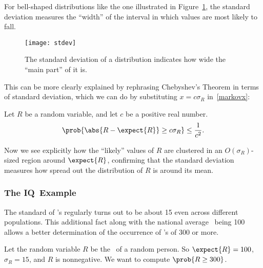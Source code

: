 For bell-shaped distributions like the one illustrated in
Figure~\ref{fig:stdev}, the standard deviation measures the ``width''
of the interval in which values are most likely to fall.
\begin{figure}
  \centerline{\texttt{[image: stdev]}}
  \caption{The standard deviation of a distribution indicates how wide the
    ``main part'' of it is.}
  \label{fig:stdev}
\end{figure}
This can be more clearly explained by rephrasing Chebyshev's Theorem
in terms of standard deviation, which we can do by substituting $x = c
\sigma_R$ in~\eqref{markovx}:
\begin{corollary}\label{cor:cheby}
Let $R$ be a random variable, and let $c$ be a positive real number.
\begin{equation}\label{markovcexp}
\prob{\abs{R - \expect{R}} \geq c \sigma_R} \leq \frac{1}{c^2}.
\end{equation}
\end{corollary}
Now we see explicitly how the ``likely'' values of $R$ are clustered
in an $O(\sigma_R)$-sized region around $\expect{R}$, confirming that
the standard deviation measures how spread out the distribution of $R$
is around its mean.

\iffalse
\begin{proof}
  Substituting $x = c \sigma_R$ in~\eqref{markovx} gives:
  \begin{displaymath}
    \prob{\card{R - \expect{R}} \geq c \sigma_R}
    \leq
    \frac{\variance{R}}{(c \sigma_R)^2}
    =  \frac{\sigma_R^2}{(c \sigma_R)^2}
    = \frac{1}{c^2}.
  \end{displaymath}


\end{proof}

\fi

\subsubsection{The IQ\ Example}\label{IQsec}

The standard  of \IQ's regularly turns out to
be about 15 even across different populations.  This additional fact
along with the national average \idx{\IQ}\ being 100 allows a better
determination of the occurrence of \IQ's of 300 or more.

Let the random variable $R$ be the \IQ\ of a random person.  So
$\expect{R} = 100$, $\sigma_R = 15$, and $R$ is nonnegative.  We want
to compute $\prob{R \geq 300}$.

